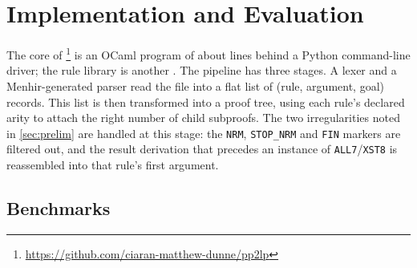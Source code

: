 \section{Implementation and Evaluation}\label{sec:eval}

The core of
\tool{}\footnote{\url{https://github.com/ciaran-matthew-dunne/pp2lp}}
is an OCaml program of about \toolOcamlLines{} lines behind a
Python command-line driver; the \lp rule library
is another \toolLpLines{}.
%
The pipeline has three stages.
%
A lexer and a Menhir-generated parser read the \replay{} file
into a flat list of (rule, argument, goal) records.
%
This list is then transformed into a proof tree, using each rule's
declared arity to attach the right number of child subproofs.
%
The two irregularities noted in \autoref{sec:prelim} are handled
at this stage: the \texttt{NRM}, \texttt{STOP\_NRM} and \texttt{FIN}
markers are filtered out, and the result derivation that precedes an
instance of \texttt{ALL7}/\texttt{XST8} is reassembled into that
rule's first argument.

%
\subsection{Benchmarks}\label{sec:bench}

